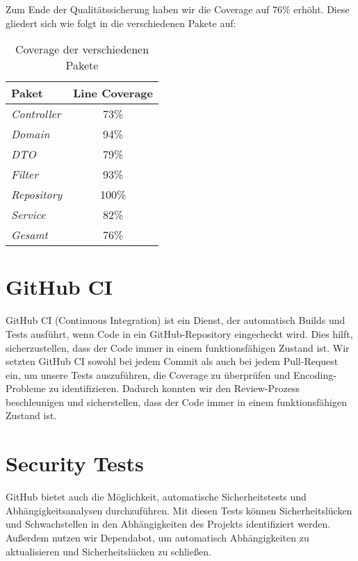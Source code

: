 Zum Ende der Qualitätssicherung haben wir die Coverage auf 76\% erhöht.
Diese gliedert sich wie folgt in die verschiedenen Pakete auf:

\begin{table}[h]
    \centering
    \renewcommand{\arraystretch}{1.3}
    \begin{tabular}{l|c}
        \textbf{Paket} & \textbf{Line Coverage} \\
        \hline
        \hline
        \textit{Controller}  & 73\% \\
        \textit{Domain}      & 94\% \\
        \textit{DTO}         & 79\% \\
        \textit{Filter}      & 93\% \\
        \textit{Repository}  & 100\% \\
        \textit{Service}     & 82\% \\
        \hline
        \textit{Gesamt}      & 76\% \\
    \end{tabular}
    \caption{Coverage der verschiedenen Pakete}
    \label{tab:progress}
\end{table}


\section{GitHub CI}
GitHub CI (Continuous Integration) ist ein Dienst, der automatisch Builds und Tests ausführt, wenn Code in ein GitHub-Repository eingecheckt wird.
Dies hilft, sicherzustellen, dass der Code immer in einem funktionsfähigen Zustand ist.
Wir setzten GitHub CI sowohl bei jedem Commit als auch bei jedem Pull-Request ein,
um unsere Tests auszuführen, die Coverage zu überprüfen und Encoding-Probleme zu identifizieren.
Dadurch konnten wir den Review-Prozess beschleunigen und sicherstellen, dass der Code immer in einem funktionsfähigen Zustand ist.

\section{Security Tests}
GitHub bietet auch die Möglichkeit, automatische Sicherheitstests und Abhängigkeitsanalysen durchzuführen.
Mit diesen Tests können Sicherheitslücken und Schwachstellen in den Abhängigkeiten des Projekts identifiziert werden.
Außerdem nutzen wir Dependabot, um automatisch Abhängigkeiten zu aktualisieren und Sicherheitslücken zu schließen.

